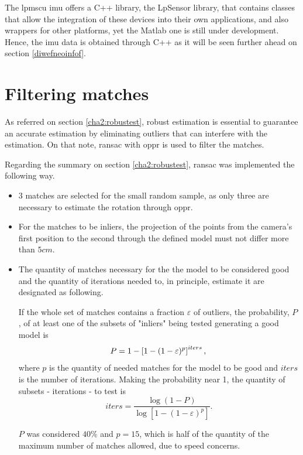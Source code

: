 The \acrshort{lpmscu} \acrshort{imu} offers a C++ library, the LpSensor library, that contains classes that allow the integration of these devices into their own applications, and also wrappers for other platforms, yet the Matlab one is still under development. Hence, the \acrshort{imu} data is obtained through C++ as it will be seen further ahead on section \ref{diwefneoinfof}.

\section{Filtering matches}
\label{rnfireonce}
As referred on section \ref{cha2:robustest}, robust estimation is essential to guarantee an accurate estimation by eliminating outliers that can interfere with the estimation. On that note, \acrshort{ransac} with \acrshort{oppr} is used to filter the matches.

Regarding the summary on section \ref{cha2:robustest}, \acrshort{ransac} was implemented the following way.

\begin{itemize}
	\item 3 matches are selected for the small random sample, as only three are necessary to estimate the rotation through \acrshort{oppr}.
	\item For the matches to be inliers, the projection of the points from the camera's first position to the second through the defined model must not differ more than $5 cm$.
	\item The quantity of matches necessary for the the model to be considered good and the quantity of iterations needed to, in principle, estimate it are designated as following.
	
	If the whole set of matches contains a fraction $\varepsilon$ of outliers, the probability, $P$, of at least one of the subsets of "inliers" being tested generating a good model is 
	\begin{equation}
	P=1-\left[1-(1-\varepsilon)^{p}\right]^{iters},\\
	\end{equation}
	where $p$ is the quantity of needed matches for the model to be good and $iters$ is the number of iterations. \cite{detep}
	Making the probability near 1, the quantity of subsets - iterations - to test is
	\begin{equation}
	iters = \frac{\log (1-P)}{\log \left[1-(1-\varepsilon)^{p}\right]}.
	\end{equation}
	
	$P$ was considered $40\%$ and $p = 15$, which is half of the quantity of the maximum number of matches allowed, due to speed concerns. 
\end{itemize}

